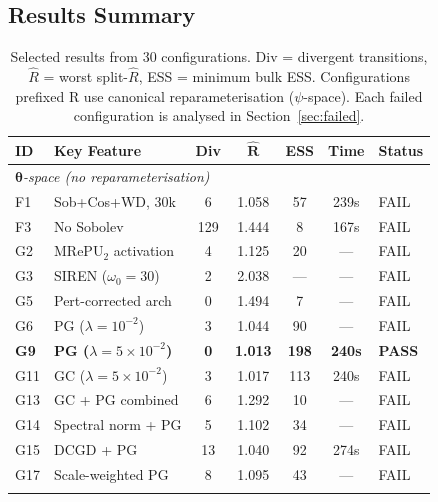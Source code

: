 \documentclass[11pt,a4paper]{article}
\theoremstyle{definition}
\newcommand{\btheta}{\boldsymbol{\theta}}
\begin{document}
	\subsection{Results Summary}
	
	\begin{table}[H]
		\centering
		\caption{Selected results from 30 configurations.
			Div = divergent transitions, $\hat{R}$ = worst split-$\hat{R}$, ESS = minimum bulk ESS.
			Configurations prefixed R use canonical reparameterisation ($\psi$-space).
			Each failed configuration is analysed in Section~\ref{sec:failed}.}
		\label{tab:results}
		\small
		\begin{tabular}{llccccl}
			\toprule
			\textbf{ID} & \textbf{Key Feature} & \textbf{Div} & $\hat{\mathbf{R}}$ & \textbf{ESS} & \textbf{Time} & \textbf{Status} \\
			\midrule
			\multicolumn{7}{l}{\emph{$\btheta$-space (no reparameterisation)}} \\
			F1 & Sob+Cos+WD, 30k & 6 & 1.058 & 57 & 239s & \textcolor{failred}{FAIL} \\
			F3 & No Sobolev & 129 & 1.444 & 8 & 167s & \textcolor{failred}{FAIL} \\
			G2 & MRePU$_2$ activation & 4 & 1.125 & 20 & --- & \textcolor{failred}{FAIL} \\
			G3 & SIREN ($\omega_0\!=\!30$) & 2 & 2.038 & --- & --- & \textcolor{failred}{FAIL} \\
			G5 & Pert-corrected arch & 0 & 1.494 & 7 & --- & \textcolor{failred}{FAIL} \\
			G6 & PG ($\lambda\!=\!10^{-2}$) & 3 & 1.044 & 90 & --- & \textcolor{failred}{FAIL} \\
			\rowcolor{green!10}
			\textbf{G9} & \textbf{PG ($\lambda\!=\!5\!\times\!10^{-2}$)} & \textbf{0} & \textbf{1.013} & \textbf{198} & \textbf{240s} & \textbf{\textcolor{passgreen}{PASS}} \\
			G11 & GC ($\lambda\!=\!5\!\times\!10^{-2}$) & 3 & 1.017 & 113 & 240s & \textcolor{failred}{FAIL} \\
			G13 & GC + PG combined & 6 & 1.292 & 10 & --- & \textcolor{failred}{FAIL} \\
			G14 & Spectral norm + PG & 5 & 1.102 & 34 & --- & \textcolor{failred}{FAIL} \\
			G15 & DCGD + PG & 13 & 1.040 & 92 & 274s & \textcolor{failred}{FAIL} \\
			G17 & Scale-weighted PG & 8 & 1.095 & 43 & --- & \textcolor{failred}{FAIL} \\
			\rowcolor{green!10}

\end{tabular}
\end{table}
\end{document}
